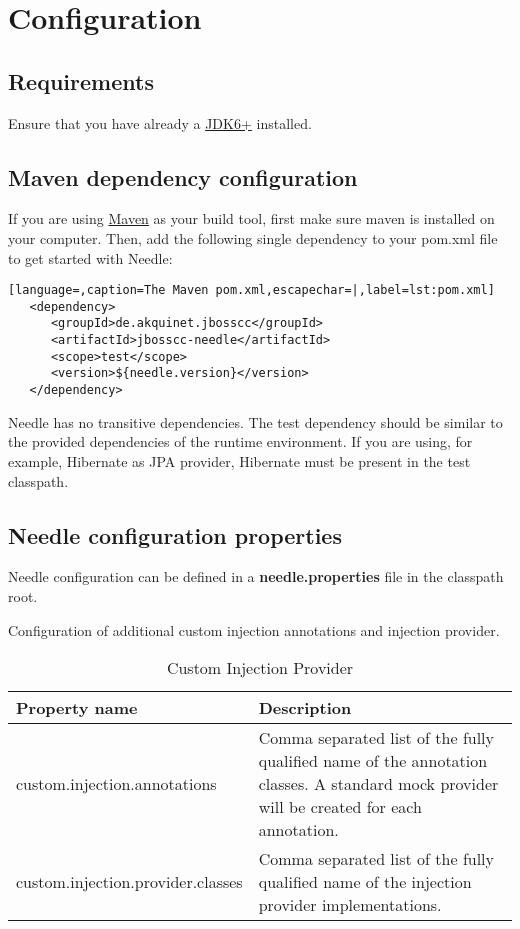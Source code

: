 \chapter{Configuration}

\section{Requirements}

Ensure that you have already a 
\href{http://www.oracle.com/technetwork/java/javase/downloads/index.html}{JDK6+} installed.

\section{Maven dependency configuration}
If you are using \href{http://maven.apache.org/}{Maven} as your build tool, first make sure maven is installed on your computer.
Then, add the following single dependency to your pom.xml file to get started with Needle:

\begin{lstlisting}[language=,caption=The Maven pom.xml,escapechar=|,label=lst:pom.xml]
   <dependency>
      <groupId>de.akquinet.jbosscc</groupId>
      <artifactId>jbosscc-needle</artifactId>
      <scope>test</scope>
      <version>${needle.version}</version>
   </dependency>
\end{lstlisting}

Needle has no transitive dependencies. The test dependency should be similar to the provided dependencies of the runtime environment.
If you are using, for example, Hibernate as JPA provider, Hibernate must be present in the test classpath.

\section{Needle configuration properties}

Needle configuration can be defined in a \textbf{needle.properties} file in the classpath root.

\parskip 14pt
\parindent 0pt
Configuration of additional custom injection annotations and injection provider.
\begin{table}[H]
\centering
\begin{tabular}{p{6cm}p{11cm}} \toprule
    \textbf{Property name} & \textbf{Description} \\ \midrule
    custom.injection.annotations & Comma separated list of the fully qualified name of the annotation classes. A standard mock provider will be created for each annotation. \\
    custom.injection.provider.classes & Comma separated list of the fully qualified name of the injection provider implementations. \\
\bottomrule
\end{tabular}
\caption{Custom Injection Provider}
\end{table}


